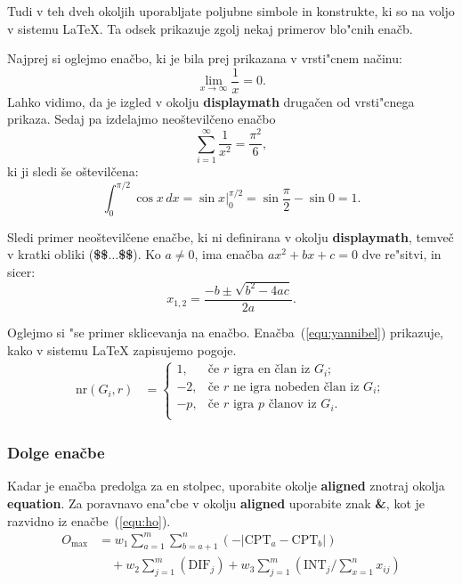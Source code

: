 \documentclass[sigconf,nonacm]{acmart}
\begin{document}
Tudi v teh dveh okoljih uporabljate poljubne simbole in konstrukte, ki so na
voljo v sistemu \LaTeX. Ta odsek prikazuje zgolj nekaj primerov blo"cnih
enačb.

Najprej si oglejmo enačbo, ki je bila prej prikazana v vrsti"cnem načinu: 
%
\begin{equation}
\lim_{x\rightarrow \infty}\frac{1}{x}=0.
\end{equation}
%
Lahko vidimo, da je izgled v okolju \textbf{displaymath} drugačen od vrsti"cnega
prikaza.  Sedaj pa izdelajmo neoštevilčeno enačbo
%
\begin{displaymath}
    \sum_{i=1}^{\infty} \frac{1}{x^2} = \frac{\pi^2}{6},
\end{displaymath}
%
ki ji sledi še oštevilčena:
%
\begin{equation}
    \int_{0}^{\pi/2} \cos x\,dx = \sin x\bigg\rvert_{0}^{\pi/2} = \sin
    \frac{\pi}{2} - \sin 0 = 1.
\end{equation}

Sledi primer neoštevilčene enačbe, ki ni definirana v okolju
\textbf{displaymath}, temveč v kratki obliki (\textbf{\$\$$\ldots$\$\$}).  Ko $a
\ne 0$, ima enačba $ax^2 + bx + c = 0$ dve re"sitvi, in sicer:
%
$$x_{1, 2} = \frac{-b \pm \sqrt{b^2-4ac}}{2a}.$$

Oglejmo si "se primer sklicevanja na enačbo. Enačba~(\ref{equ:yannibel})
prikazuje, kako v sistemu \LaTeX{} zapisujemo pogoje.
%
\begin{equation}
    \begin{aligned} 
        \mathrm{nr}(G_i,r) & = \label{equ:yannibel}
        \begin{cases}
            1,  & \text{če $r$ igra en član iz $G_i$};\\
            -2, & \text{če $r$ ne igra nobeden član iz $G_i$}; \\
            -p, & \text{če $r$ igra $p$ članov iz $G_i$}.\\
        \end{cases}
    \end{aligned}
\end{equation}

\subsubsection{Dolge enačbe}

Kadar je enačba predolga za en stolpec, uporabite okolje \textbf{aligned}
znotraj okolja \textbf{equation}.  Za poravnavo ena"cbe v okolju
\textbf{aligned} uporabite znak \textbf{\&}, kot je razvidno iz
enačbe~(\ref{equ:ho}).
%
\begin{equation}
    \begin{aligned}
        O_{\max}& = w_1 \sum_{a=1}^{m} \sum_{b=a+1}^{n} (-\lvert\text{CPT}_a 
        -\text{CPT}_b\rvert)\\ 
        &\quad + w_2 \sum_{j=1}^{m} (\text{DIF}_j) + w_3 \sum_{j=1}^{m} 
        (\text{INT}_j/\sum_{x=1}^{n} x_{ij})
    \end{aligned}
    \label{equ:ho}
\end{equation}
\end{document}
